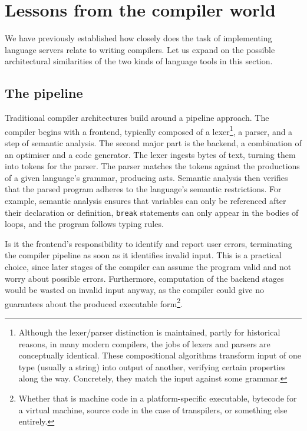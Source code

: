 \section{Lessons from the compiler world}

We have previously established how closely does the task of implementing
language servers relate to writing compilers. Let us expand on the possible
architectural similarities of the two kinds of language tools in this section.

\subsection{The pipeline}

Traditional compiler architectures build around a pipeline approach. The
compiler begins with a frontend, typically composed of a lexer\footnote{Although
the lexer/parser distinction is maintained, partly for historical reasons, in
many modern compilers, the jobs of lexers and parsers are conceptually
identical. These compositional algorithms transform input of one type (usually a
string) into output of another, verifying certain properties along the way.
Concretely, they match the input against some
grammar\footnotemark.}, a parser, and a step of semantic analysis. The
second major part is the backend, a combination of an optimiser and a code
generator. The lexer ingests bytes of text, turning them into tokens for the
parser. The parser matches the tokens against the productions of a given
language's grammar, producing \acrlong{ast}s. Semantic analysis then verifies
that the parsed program adheres to the language's semantic restrictions. For
example, semantic analysis ensures that variables can only be referenced after
their declaration or definition, \texttt{break} statements can only appear in
the bodies of loops, and the program follows typing rules.

Is it the frontend's responsibility to identify and report user errors,
terminating the compiler pipeline as soon as it identifies invalid input. This
is a practical choice, since later stages of the compiler can assume the program
valid and not worry about possible errors. Furthermore, computation of the
backend stages would be wasted on invalid input anyway, as the compiler could
give no guarantees about the produced executable form\footnote{Whether that is
machine code in a platform-specific executable, bytecode for a virtual machine,
source code in the case of transpilers, or something else entirely.}.

